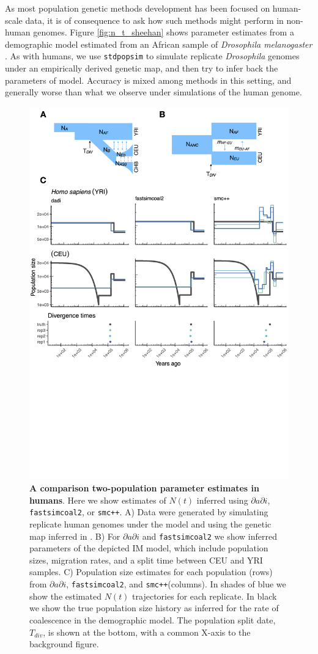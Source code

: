 \documentclass[12pt,halfline,a4paper]{ouparticle}
\newcommand{\stdpopsim}{\texttt{stdpopsim}\xspace}
\newcommand{\dadi}{$\partial a \partial i$\xspace}
\newcommand{\smcpp}{\texttt{smc++}\xspace}
\begin{document}
As most population genetic methods development has been focused on human-scale
data, it is of consequence to ask how such methods might perform in non-human
genomes. Figure \ref{fig:n_t_sheehan} shows parameter estimates from a demographic
model estimated from an African sample of \emph{Drosophila melanogaster} \citep{sheehan2016deep}.
As with humans, we use \stdpopsim to simulate replicate \emph{Drosophila} genomes under
an empirically derived genetic map, and then try to infer back the parameters of model.
Accuracy is mixed among methods in this setting, and generally worse than what we
observe under simulations of the human genome.



\begin{figure}
\begin{center}
\includegraphics[width=0.7\linewidth]{display_items/homo_sapiens_two_popn_comp.png}
\caption{\textbf{A comparison two-population parameter estimates in humans}. Here we show estimates of $N(t)$ inferred using \dadi, \texttt{fastsimcoal2}, or \smcpp.
A) Data were generated by simulating
replicate human genomes under the \cite{gutenkunst2009inferring} model and using the genetic map
inferred in \cite{international2007second}. B) For \dadi and \texttt{fastsimcoal2} we show inferred
parameters of the depicted IM model, which include population sizes, migration rates, and a split
time between CEU and YRI samples. C) Population size estimates for each population (rows)
from \dadi, \texttt{fastsimcoal2}, and \smcpp (columns). In shades of blue we show the estimated
$N(t)$ trajectories for each replicate. In black we show the true population size history as inferred
for the rate of coalescence in the demographic model. The population split date, $T_{div}$, is shown at
the bottom, with a common X-axis to the background figure.}
\label{fig:IM_popn_human}
\end{center}
\end{figure}
\end{document}
